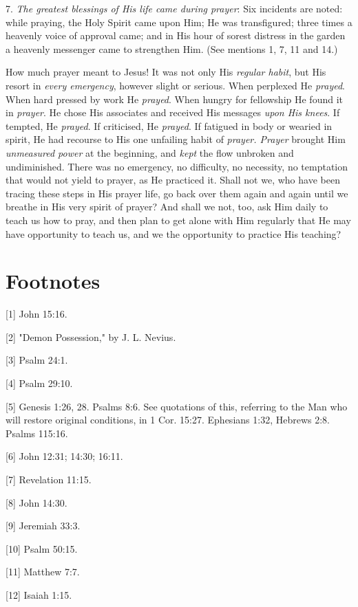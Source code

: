7. \textit{The greatest blessings of His life came during prayer}: Six incidents
are noted: while praying, the Holy Spirit came upon Him; He was
transfigured; three times a heavenly voice of approval came; and in His
hour of sorest distress in the garden a heavenly messenger came to
strengthen Him. (See mentions 1, 7, 11 and 14.)

How much prayer meant to Jesus! It was not only His \textit{regular habit}, but
His resort in \textit{every emergency}, however slight or serious. When perplexed
He \textit{prayed}. When hard pressed by work He \textit{prayed}. When hungry for
fellowship He found it in \textit{prayer}. He chose His associates and received
His messages \textit{upon His knees}. If tempted, He \textit{prayed}. If criticised, He
\textit{prayed}. If fatigued in body or wearied in spirit, He had recourse to His
one unfailing habit of \textit{prayer. Prayer} brought Him \textit{unmeasured power} at
the beginning, and \textit{kept} the flow unbroken and undiminished. There was no
emergency, no difficulty, no necessity, no temptation that would not yield
to prayer, as He practiced it. Shall not we, who have been tracing these
steps in His prayer life, go back over them again and again until we
breathe in His very spirit of prayer? And shall we not, too, ask Him daily
to teach us how to pray, and then plan to get alone with Him regularly
that He may have opportunity to teach us, and we the opportunity to
practice His teaching?


\chapter{Footnotes}

[1] John 15:16.

[2] "Demon Possession," by J. L. Nevius.

[3] Psalm 24:1.

[4] Psalm 29:10.

[5] Genesis 1:26, 28. Psalms 8:6. See quotations of this, referring to the
Man who will restore original conditions, in 1 Cor. 15:27. Ephesians 1:32,
Hebrews 2:8. Psalms 115:16.

[6] John 12:31; 14:30; 16:11.

[7] Revelation 11:15.

[8] John 14:30.

[9] Jeremiah 33:3.

[10] Psalm 50:15.

[11] Matthew 7:7.

[12] Isaiah 1:15.


